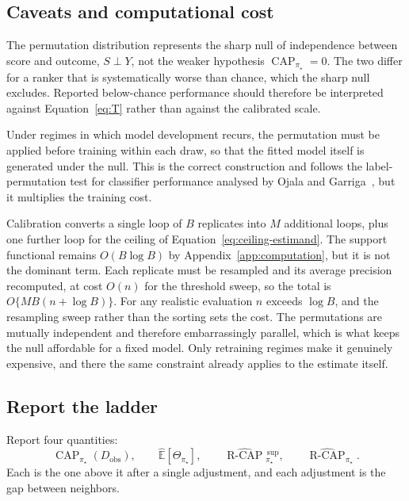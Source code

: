\documentclass[11pt]{article}
\newcommand{\CAP}{\operatorname{CAP}}
\newcommand{\Tpi}{\CAP_{\pi_\star}}
\newcommand{\E}{\mathbb{E}}
\newcommand{\RCAPHat}{\widehat{\operatorname{R\text{-}CAP}}{}^{\,\mathrm{sup}}_{\pi_\star}}
\newcommand{\RCAPcalHat}{\widehat{\operatorname{R\text{-}CAP}}_{\pi_\star}}
\theoremstyle{remark}
\begin{document}
\subsection{Caveats and computational cost}
\label{sec:caveats}

The permutation distribution represents the sharp null of independence between score and outcome, $S\perp Y$, not the weaker hypothesis $\CAP_{\pi_\star}=0$. The two differ for a ranker that is systematically worse than chance, which the sharp null excludes. Reported below-chance performance should therefore be interpreted against Equation~\eqref{eq:T} rather than against the calibrated scale.

Under regimes in which model development recurs, the permutation must be applied before training within each draw, so that the fitted model itself is generated under the null. This is the correct construction and follows the label-permutation test for classifier performance analysed by Ojala and Garriga~\cite{ojala2010permutation}, but it multiplies the training cost.

Calibration converts a single loop of $B$ replicates into $M$ additional loops, plus one further loop for the ceiling of Equation~\eqref{eq:ceiling-estimand}. The support functional remains $O(B\log B)$ by Appendix~\ref{app:computation}, but it is not the dominant term. Each replicate must be resampled and its average precision recomputed, at cost $O(n)$ for the threshold sweep, so the total is $O\{MB(n+\log B)\}$. For any realistic evaluation $n$ exceeds $\log B$, and the resampling sweep rather than the sorting sets the cost. The permutations are mutually independent and therefore embarrassingly parallel, which is what keeps the null affordable for a fixed model. Only retraining regimes make it genuinely expensive, and there the same constraint already applies to the estimate itself.

\subsection{Report the ladder}
\label{sec:reporting}

Report four quantities:
\[
\Tpi(D_{\mathrm{obs}}),
\qquad
\widehat{\E}[\Theta_{\pi_\star}],
\qquad
\RCAPHat,
\qquad
\RCAPcalHat .
\]
Each is the one above it after a single adjustment, and each adjustment is the gap between neighbors.
\end{document}
